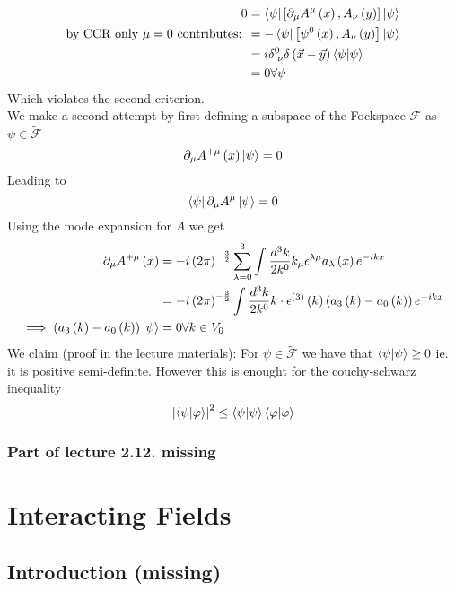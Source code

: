 \documentclass{report}
\begin{document}
\begin{align*}
  0 &= \bra{\psi} \left[ \partial_\mu A^{\mu} \left( x \right)  , A_\nu \left( y \right)  \right]\ket{\psi}   \\
  \text{by CCR only $\mu = 0$ contributes:  } &= - \bra{\psi} \left[ \psi^{0}\left( x \right) , A_\nu \left( y \right)  \right] \ket{\psi}   \\
  &= i \delta^{0} _{\text{ }\nu} \delta\left( \vec{x} - \vec{y} \right) \bra{\psi} \ket{\psi}  \\
  &= 0 \forall \psi 
\end{align*}
Which violates the second criterion.\\
We make a second attempt by first defining a subspace of the Fockspace $\tilde{\mathcal{F} } $ as $\psi \in \tilde{\mathcal{F} }  $ \[
\partial_\mu A^{+\mu} \left( x \right) \ket{\psi} =0 
\] 
Leading to \[
\bra{\psi} \partial_\mu A^{\mu} \ket{\psi} = 0 
\] 
Using the mode expansion for $A$ we get
\begin{align*}
  \partial_\mu A^{+\mu} \left( x \right) &= -i \left( 2\pi \right) ^{-\frac{3}{2} }  \sum_{\lambda=0}^{3} \int_{}^{} \frac{d^3 k}{2 k^{0} } k_\mu \epsilon^{\lambda \mu} a_\lambda \left( x \right) e^{-ikx}   \\
  &= -i \left( 2\pi \right) ^{-\frac{3}{2} } \int_{}^{} \frac{d^3k}{2 k^{0} } k \cdot  \epsilon^{(3)}\left(k \right)\left( a_3\left( k \right) - a_0\left( k \right)  \right) e^{-ikx}  \\
  \implies \left( a_3\left( k \right) - a_0\left( k \right)  \right) \ket{\psi} &= 0 \forall k \in V_0
\end{align*}
We claim (proof in the lecture materials): For $\psi \in \tilde{\mathcal{F} } $ we have that $\bra{\psi} \ket{\psi} \ge 0$ ie. it is positive semi-definite. However this is enought for the couchy-schwarz inequality \[
\abs{\bra{\psi} \ket{\varphi} } ^2 \le \bra{\psi} \ket{\psi} \bra{\varphi} \ket{\varphi} 
\] 
\subsection{Part of lecture 2.12. missing}

\chapter{Interacting Fields}
\section{Introduction (missing)}
\end{document}
